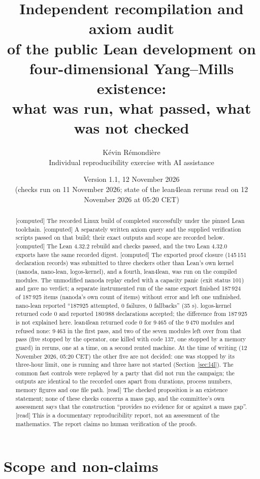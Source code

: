 \documentclass[11pt,a4paper]{article}
\title{Independent recompilation and axiom audit\\
of the public Lean development on\\
four-dimensional Yang--Mills existence:\\
what was run, what passed, what was not checked}
\author{K\'evin R\'emondi\`ere\\\small Individual reproducibility exercise with AI assistance}
\date{Version 1.1, 12 November 2026\\\small (checks run on 11 November 2026; state of the lean4lean reruns read on 12 November 2026 at 05:20 CET)}
\theoremstyle{plain}
\theoremstyle{definition}
\theoremstyle{remark}
\numberwithin{equation}{section}
\newcommand{\st}[1]{\textsf{[#1]}}
\begin{document}
\maketitle

\begin{abstract}
\st{computed} The recorded Linux build of
 completed successfully under the pinned Lean toolchain.
\st{computed} A separately written axiom query and the supplied verification scripts passed on that build;
their exact outputs and scope are recorded below.
\st{computed} The Lean 4.32.2 rebuild and checks passed, and the two Lean 4.32.0 exports have the same recorded
digest. \st{computed} The exported proof closure (145\,151 declaration records) was submitted to three checkers other than Lean's own kernel (nanoda, nano-lean, logos-kernel), and a fourth, lean4lean, was run on the compiled modules.
The unmodified nanoda replay ended with a capacity panic (exit status 101) and gave no verdict; a separate instrumented run of the same
export finished 187\,924 of 187\,925 items (nanoda's own count of items) without error and left one unfinished. nano-lean reported
``187925 attempted, 0 failures, 0 fallbacks'' (35 s). logos-kernel returned code 0 and reported 180\,988 declarations accepted; the difference
from 187\,925 is not explained here. lean4lean returned code 0 for 9\,465 of the 9\,470 modules and refused none:
9\,463 in the first pass, and two of the seven modules left over from that pass (five stopped by the operator, one killed with code 137, one stopped by a
memory guard) in reruns, one at a time, on a second rented machine. At the time of writing (12 November 2026, 05:20 CET) the other five are not decided:
one was stopped by its three-hour limit, one is running and three have not started (Section~\ref{sec:l4l}).
The common fast controls were replayed by a party that did not run the campaign; the outputs are identical to the recorded ones
apart from durations, process numbers, memory figures and one file path. \st{read} The checked proposition is an existence statement; none of these checks
concerns a mass gap, and the committee's own assessment says that the construction ``provides no evidence for or against a mass gap''.
\st{read} This is a documentary reproducibility report, not an assessment of the mathematics.
The report claims no human verification of the proofs.
\end{abstract}

\section{Scope and non-claims}
\end{document}
